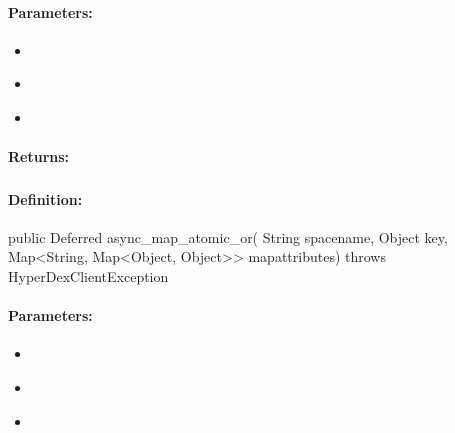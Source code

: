 \paragraph{Parameters:}
\begin{itemize}[noitemsep]
\item {}\\

\item {}\\

\item {}\\

\end{itemize}

\paragraph{Returns:}


\pagebreak
\subsubsection{}
\label{api:java:async_map_atomic_or}


\paragraph{Definition:}
\begin{javacode}
public Deferred async_map_atomic_or(
        String spacename,
        Object key,
        Map<String, Map<Object, Object>> mapattributes) throws HyperDexClientException
\end{javacode}

\paragraph{Parameters:}
\begin{itemize}[noitemsep]
\item {}\\

\item {}\\

\item {}\\

\end{itemize}

